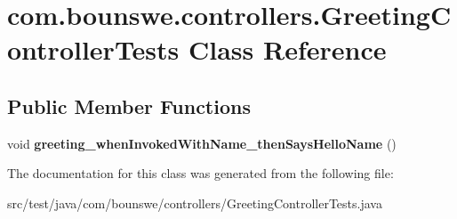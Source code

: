 \hypertarget{classcom_1_1bounswe_1_1controllers_1_1_greeting_controller_tests}{}\section{com.\+bounswe.\+controllers.\+Greeting\+Controller\+Tests Class Reference}
\label{classcom_1_1bounswe_1_1controllers_1_1_greeting_controller_tests}
\subsection*{Public Member Functions}
\begin{DoxyCompactItemize}
\item 
\mbox{\label{classcom_1_1bounswe_1_1controllers_1_1_greeting_controller_tests_a3c06fa081d3ecc8132dc8e061bc2147c}} 
void {\bfseries greeting\+\_\+when\+Invoked\+With\+Name\+\_\+then\+Says\+Hello\+Name} ()
\end{DoxyCompactItemize}


The documentation for this class was generated from the following file\+:\begin{DoxyCompactItemize}
\item 
src/test/java/com/bounswe/controllers/Greeting\+Controller\+Tests.\+java\end{DoxyCompactItemize}
